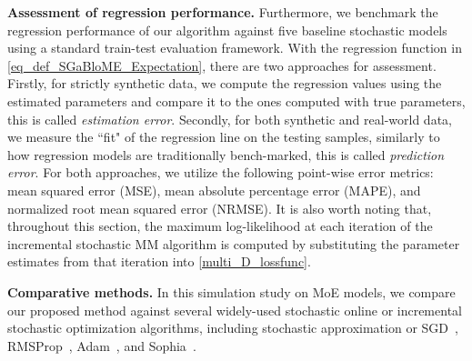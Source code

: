 \documentclass{article}
\begin{document}

{\bf Assessment of regression performance.} Furthermore, we benchmark the regression performance of our algorithm against five baseline stochastic models using a standard train-test evaluation framework. With the regression function in \cref{eq_def_SGaBloME_Expectation}, there are two approaches for assessment. Firstly, for strictly synthetic data, we compute the regression values using the estimated parameters and compare it to the ones computed with true parameters, this is called \emph{estimation error}. Secondly, for both synthetic and real-world data, we measure the ``fit" of the regression line on the testing samples, similarly to how regression models are traditionally bench-marked, this is called \emph{prediction error}. For both approaches, we utilize the following point-wise error metrics: mean squared error (MSE), mean absolute percentage error (MAPE), and normalized root mean squared error (NRMSE). It is also worth noting that, throughout this section, the maximum log-likelihood at each iteration of the incremental stochastic MM algorithm is computed by substituting the parameter estimates from that iteration into \cref{multi_D_lossfunc}.

{\bf Comparative methods.} In this simulation study on MoE models, we compare our proposed method against several widely-used stochastic online or incremental stochastic optimization algorithms, including stochastic approximation or SGD~\cite{robbins_stochastic_1951}, RMSProp~\cite{hinton_neural_2012}, Adam~\cite{kingma_adam_2015}, and Sophia~\cite{liu_sophia_2024}.
\end{document}
